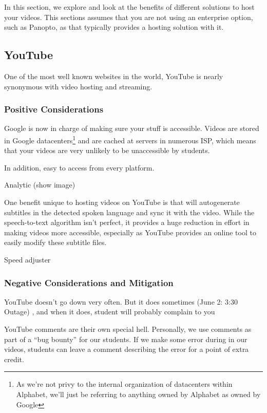 \documentclass[sigconf]{acmart}
\begin{document}
In this section, we explore and look at the benefits of different solutions to host your videos.  
This sections assumes that you are not using an enterprise option, such as Panopto, as that typically provides a hosting solution with it.

\subsection{YouTube}
One of the most well known websites in the world, YouTube is nearly synonymous with video hosting and streaming.


\subsubsection{Positive Considerations}
Google is now in charge of making sure your stuff is accessible.
Videos are stored in Google datacenters\footnote{As we're not privy to the internal organization of datacenters within Alphabet, we'll just be referring to anything owned by Alphabet as owned by Google} and are cached at servers in numerous ISP, which means that your videos are very unlikely to be unaccessible by students. 

In addition, easy to access from every platform.

Analytic  (show image)


One benefit unique to hosting videos on YouTube is that will autogenerate subtitles in the detected spoken language \cite{liao2013large} and sync it with the video.  While the speech-to-text algorithm isn't perfect, it provides a huge reduction in effort in making videos more accessible, especially as YouTube provides an online tool to easily modify these subtitle files.


Speed adjuster

\subsubsection{Negative Considerations and Mitigation}
YouTube doesn't go down very often.  
But it does sometimes \cite{outage2018} (June 2: 3:30 Outage) \cite{outage2019}, and when it does, student will probably complain to you 

YouTube comments are their own special hell.
Personally, we use comments as part of a ``bug bounty'' for our students.
If we make some error during in our videos, students can leave a comment describing the error for a point of extra credit.
\end{document}
